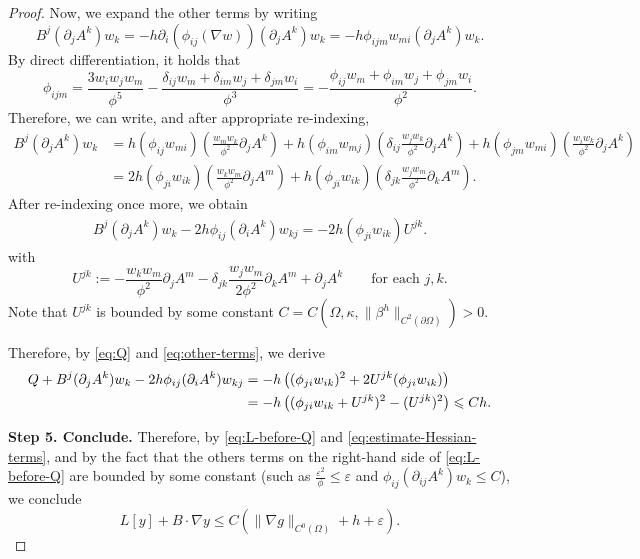 \documentclass[11pt]{article}
\numberwithin{equation}{section}
\def\le{\leqslant}
\def\leq{\leqslant}
\begin{document}
\begin{proof}
Now, we expand the other terms by writing
\[
B^j (\partial_j A^k) w_k = -h \partial_i (\phi_{ij}(\nabla w))(\partial_j A^k) w_k = -h\phi_{ijm}w_{mi}(\partial_j A^k)w_k.
\]
By direct differentiation, it holds that
\[
\phi_{ijm} = \frac{3w_i w_j w_m}{\phi^5} - \frac{\delta_{ij} w_m + \delta_{im} w_j + \delta_{jm} w_i}{\phi^3} = -\frac{\phi_{ij}w_m+\phi_{im}w_j+\phi_{jm}w_i}{\phi^2}.
\]
Therefore, we can write, and after appropriate re-indexing,
\begin{align*}
B^j (\partial_j A^k) w_k &= h(\phi_{ij}w_{mi})\left(\frac{w_mw_k}{\phi^2}\partial_j A^k\right) + h(\phi_{im}w_{mj})\left(\delta_{ij}\frac{w_j w_k}{\phi^2}\partial_j A^k\right) + h(\phi_{jm}w_{mi})\left(\frac{w_iw_k}{\phi^2}\partial_j A^k\right) \\
&= 2h(\phi_{ji}w_{ik})\left(\frac{w_k w_m}{\phi^2}\partial_j A^m\right) + h(\phi_{ji}w_{ik})\left(\delta_{jk}\frac{w_j w_m}{\phi^2}\partial_k A^m\right).
\end{align*}
After re-indexing once more, we obtain
\begin{align}\label{eq:other-terms}
B^j (\partial_j A^k) w_k - 2h\phi_{ij}(\partial_iA^k)w_{kj} = -2h(\phi_{ji}w_{ik})U^{jk}.
\end{align}
with
\[
U^{jk}:=-\frac{w_k w_m}{\phi^2}\partial_j A^m-\delta_{jk}\frac{w_j w_m}{2\phi^2}\partial_k A^m + \partial_jA^k\qquad\text{for each }j,k.
\]
Note that $U^{jk}$ is bounded by some constant $C=C(\Omega,\kappa,\|\beta^h\|_{C^2(\partial\Omega)})>0$. 

Therefore, by \eqref{eq:Q} and \eqref{eq:other-terms}, we derive
\begin{align}
Q  + B^j (\partial_j A^k) w_k - 2h\phi_{ij}(\partial_iA^k)w_{kj} &= -h\left((\phi_{ji}w_{ik})^2 + 2U^{jk}(\phi_{ji}w_{ik})\right) \notag \\
&= -h\left((\phi_{ji}w_{ik}+U^{jk})^2-(U^{jk})^2\right) \leq Ch \label{eq:estimate-Hessian-terms}.
\end{align}

\medskip 

\textbf{Step 5. Conclude.} Therefore, by \eqref{eq:L-before-Q} and \eqref{eq:estimate-Hessian-terms}, and by the fact that the others terms on the right-hand side of \eqref{eq:L-before-Q} are bounded by some constant (such as $\frac{\varepsilon^2}{\phi}\leq \varepsilon$ and $\phi_{ij}(\partial_{ij}A^k)w_k \leq C$), we conclude
\[
L[y] + B \cdot \nabla y \le C(\|\nabla g\|_{C^0(\Omega)} + h + \varepsilon).
\]

\medskip


\end{proof}
\end{document}
